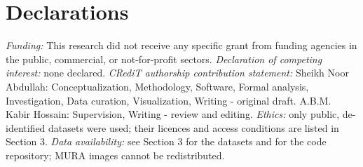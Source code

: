 \section{Declarations}
\emph{Funding:} This research did not receive any specific grant from funding agencies in the public, commercial, or not-for-profit sectors.
\emph{Declaration of competing interest:} none declared.
\emph{CRediT authorship contribution statement:} Sheikh Noor Abdullah: Conceptualization, Methodology, Software, Formal analysis, Investigation, Data curation, Visualization, Writing - original draft. A.B.M. Kabir Hossain: Supervision, Writing - review and editing.
\emph{Ethics:} only public, de-identified datasets were used; their licences and access conditions are listed in Section 3. \emph{Data availability:} see Section 3 for the datasets and for the code repository; MURA images cannot be redistributed.

